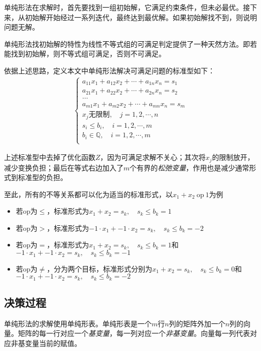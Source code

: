 单纯形法在求解时，首先要找到一组初始解，它满足约束条件，但未必最优。接下来，从初始解开始经过一系列迭代，最终达到最优解。如果初始解找不到，则说明问题无解。

单纯形法找初始解的特性为线性不等式组的可满足判定提供了一种天然方法。即若能找到初始解，则不等式组可满足，否则不可满足。

依据上述思路，定义本文中单纯形法解决可满足问题的标准型如下：
\begin{eqnarray*}
  \begin{cases}
    a_{11}x_1 + a_{12}x_2 + \cdots + a_{1n}x_n = s_1 \\
    a_{21}x_1 + a_{22}x_2 + \cdots + a_{2n}x_n = s_2 \\
    \dots \\
    a_{m1}x_1 + a_{m2}x_2 + \cdots + a_{mn}x_n = s_m \\
    x_j \textrm{无限制}, \quad j = 1, 2, \cdots, n \\
    s_i \leq b_i, \quad i = 1, 2, \cdots, m \\
    b_i \in \mathbb{Q}, \quad i = 1, 2, \cdots, m \\
  \end{cases}
\end{eqnarray*}

上述标准型中去掉了优化函数$Z$，因为可满足求解不关心；其次将$x_j$的限制放开，减少变换负担；最后在等式右边加入了$m$个有界的\emph{松弛变量}，作用也是减少通常形式到标准型的负担。

至此，所有的不等关系都可以化为适当的标准形式，以$x_1+x_2 \  \mathrm{op} \  1$为例
\begin{itemize}
  \item 若op为$\leq$，标准形式为$x_1+x_2 = s_k, \quad s_k \leq b_k = 1$
  \item 若op为$>$，标准形式为$-1 \cdot x_1 + -1 \cdot x_2 = s_k, \quad s_k \leq b_k = -2$
  \item 若op为$=$，标准形式为$x_1+x_2 = s_k, \quad s_k \leq b_k = 1$和$-1 \cdot x_1 + -1 \cdot x_2 = s_k, \quad s_k \leq b_k = -1$
  \item 若op为$\neq$，分为两个目标，标准形式分别为$x_1+x_2 = s_k, \quad s_k \leq b_k = 0$和$-1 \cdot x_1 + -1 \cdot x_2 = s_k, \quad s_k \leq b_k = -2$
\end{itemize}

\subsection{决策过程}
单纯形法的求解使用单纯形表。单纯形表是一个$m$行$n$列的矩阵外加一个$n$列的向量。矩阵的每一行对应一个\emph{基变量}，每一列对应一个\emph{非基变量}。向量每一列代表对应非基变量当前的赋值。

